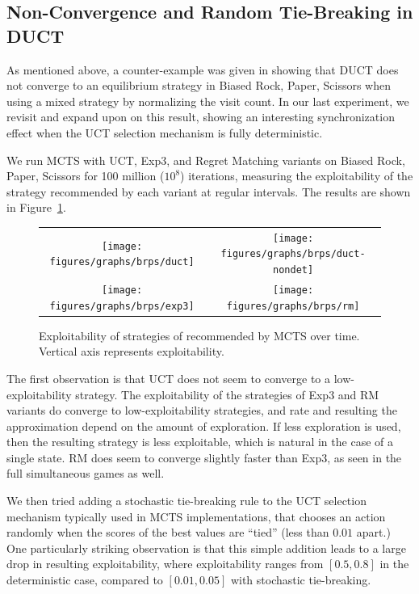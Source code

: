 \subsection{Non-Convergence and Random Tie-Breaking in DUCT} 

As mentioned above, a counter-example was given in \cite{Shafiei09} showing that 
DUCT does not converge to an equilibrium strategy in Biased Rock, Paper, Scissors 
when using a mixed strategy by normalizing the visit count.
In our last experiment, we revisit and expand upon on this result, showing an interesting 
synchronization effect when the UCT selection mechanism is fully deterministic.

We run MCTS with UCT, Exp3, and Regret Matching variants on Biased Rock, Paper, Scissors
for 100 million ($10^8$) iterations, measuring the exploitability of the strategy recommended by 
each variant at regular intervals. The results are shown in Figure~\ref{fig:expl-brps}.

\begin{figure}[t]
\begin{tabular}{cc}
\hspace{-1cm} \texttt{[image: figures/graphs/brps/duct]} & \texttt{[image: figures/graphs/brps/duct-nondet]}\\
\hspace{-1cm} \texttt{[image: figures/graphs/brps/exp3]} & \texttt{[image: figures/graphs/brps/rm]}\\
\end{tabular}
\caption{Exploitability of strategies of recommended by MCTS over time. Vertical axis represents exploitability. \label{fig:expl-brps}}
\end{figure}

The first observation is that UCT does not seem to converge to a low-exploitability strategy. The exploitability of the strategies of 
Exp3 and RM variants do converge to low-exploitability strategies, and rate and resulting the approximation depend on the amount of exploration. 
If less exploration is used, then the resulting strategy is less exploitable, which is natural in the case of a single state. RM does seem to 
converge slightly faster than Exp3, as seen in the full simultaneous games as well. 

We then tried adding a stochastic tie-breaking rule to the UCT selection mechanism typically used in MCTS implementations, that chooses an 
action randomly when the scores of the best values are ``tied'' (less than $0.01$ apart.)
One particularly striking observation is that this simple addition leads to a large drop in resulting exploitability, where exploitability
ranges from $[0.5,0.8]$ in the deterministic case, compared to $[0.01,0.05]$ with stochastic tie-breaking. 

